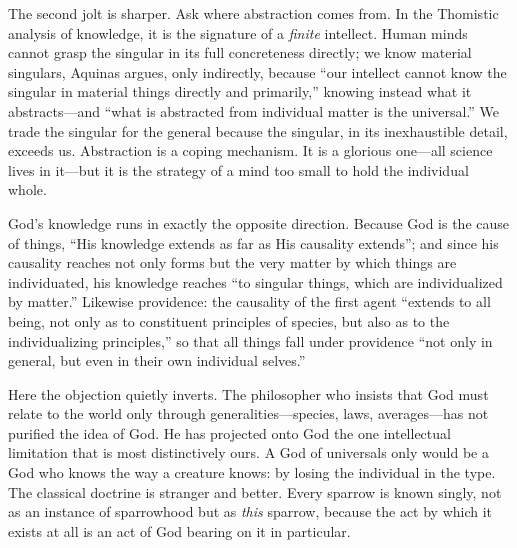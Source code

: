 The second jolt is sharper. Ask where abstraction comes from. In the Thomistic analysis of knowledge, it is the signature of a \emph{finite} intellect. Human minds cannot grasp the singular in its full concreteness directly; we know material singulars, Aquinas argues, only indirectly, because ``our intellect cannot know the singular in material things directly and primarily,'' knowing instead what it abstracts---and ``what is abstracted from individual matter is the universal.'' We trade the singular for the general because the singular, in its inexhaustible detail, exceeds us. Abstraction is a coping mechanism. It is a glorious one---all science lives in it---but it is the strategy of a mind too small to hold the individual whole.

God's knowledge runs in exactly the opposite direction. Because God is the cause of things, ``His knowledge extends as far as His causality extends''; and since his causality reaches not only forms but the very matter by which things are individuated, his knowledge reaches ``to singular things, which are individualized by matter.'' Likewise providence: the causality of the first agent ``extends to all being, not only as to constituent principles of species, but also as to the individualizing principles,'' so that all things fall under providence ``not only in general, but even in their own individual selves.''

Here the objection quietly inverts. The philosopher who insists that God must relate to the world only through generalities---species, laws, averages---has not purified the idea of God. He has projected onto God the one intellectual limitation that is most distinctively ours. A God of universals only would be a God who knows the way a creature knows: by losing the individual in the type. The classical doctrine is stranger and better. Every sparrow is known singly, not as an instance of sparrowhood but as \emph{this} sparrow, because the act by which it exists at all is an act of God bearing on it in particular.

